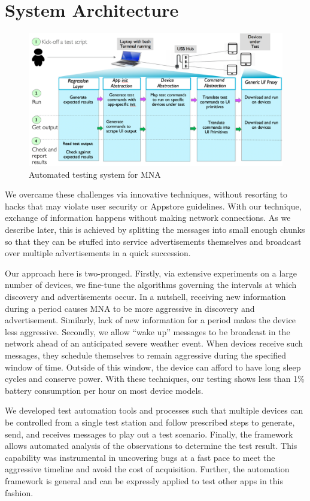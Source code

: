 \documentclass[conference]{IEEEtran}
\begin{document}
\section{System Architecture}
\label{sec:architecture}
%

\begin{figure}[htbp]
\centerline{\includegraphics[width=\columnwidth]{figs/test_arch}}
\caption{Automated testing system for MNA}
\label{fig:test_arch}
\end{figure}

We overcame these challenges via innovative techniques, without
resorting to hacks that may violate user security or Appstore
guidelines. With our technique, exchange of information happens
without making network connections. As we describe later, this is
achieved by splitting the messages into small enough chunks so that
they can be stuffed into service advertisements themselves and
broadcast over multiple advertisements in a quick succession.

Our approach here is two-pronged. Firstly, via extensive experiments
on a large number of devices, we fine-tune the algorithms governing
the intervals at which discovery and advertisements occur. In a
nutshell, receiving new information during a period causes MNA to be
more aggressive in discovery and advertisement. Similarly, lack of new
information for a period makes the device less aggressive. Secondly,
we allow ``wake up'' messages to be broadcast in the network ahead of
an anticipated severe weather event. When devices receive such
messages, they schedule themselves to remain aggressive during the
specified window of time. Outside of this window, the device can
afford to have long sleep cycles and conserve power. With these
techniques, our testing shows less than 1\% battery consumption per
hour on most device models.

We developed test automation tools and processes such that multiple
devices can be controlled from a single test station and follow
prescribed steps to generate, send, and receives messages to play out
a test scenario. Finally, the framework allows automated analysis of
the observations to determine the test result. This capability was
instrumental in uncovering bugs at a fast pace to meet the aggressive
timeline and avoid the cost of acquisition. Further, the automation
framework is general and can be expressly applied to test other apps
in this fashion.
\end{document}
